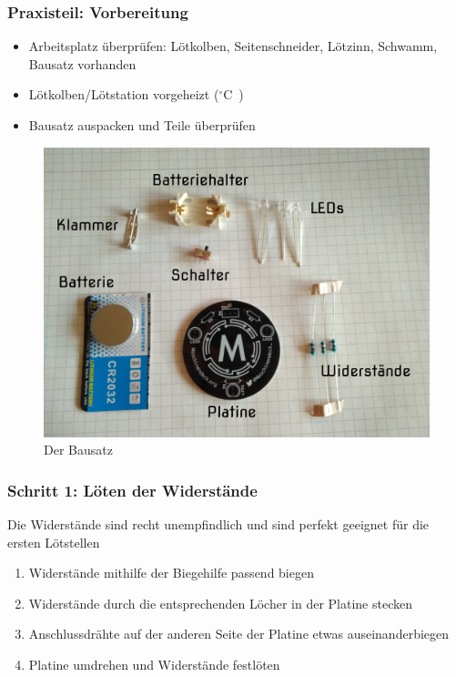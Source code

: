 \documentclass[10pt]{beamer}
\begin{document}
	\begin{frame}
	\frametitle{Praxisteil: Vorbereitung}
	\begin{itemize}
		\item{Arbeitsplatz überprüfen: Lötkolben, Seitenschneider, Lötzinn, Schwamm, Bausatz vorhanden}
		\item{Lötkolben/Lötstation vorgeheizt (\unit[350]{$^\circ$C})}
		\item{Bausatz auspacken und Teile überprüfen}
	\end{itemize}
	\begin{figure}[hbtp]
		\centering
		\includegraphics[width=\linewidth*5/10]{images/badge.jpg}
		\caption{Der Bausatz}
	\end{figure}
	\end{frame}

	\begin{frame}
	\frametitle{Schritt 1: Löten der Widerstände}
	Die Widerstände sind recht unempfindlich und sind perfekt geeignet für die ersten Lötstellen
	\begin{enumerate} 
		\item{Widerstände mithilfe der Biegehilfe passend biegen}
		\item{Widerstände durch die entsprechenden Löcher in der Platine stecken}
		\item{Anschlussdrähte auf der anderen Seite der Platine etwas auseinanderbiegen}
		\item{Platine umdrehen und Widerstände festlöten}
	\end{enumerate}
	\end{frame}
\end{document}
